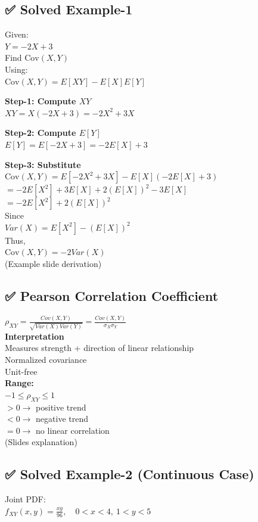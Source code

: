 \documentclass{article}
\begin{document}
\subsection{✅ Solved Example-1}
Given: \\
$Y=-2X+3$ \\
Find $\text{Cov}(X,Y)$ \\
Using: \\
$\text{Cov}(X,Y)=E[XY]-E[X]E[Y]$

\textbf{Step-1: Compute $XY$} \\
$XY=X(-2X+3)=-2X^2+3X$

\textbf{Step-2: Compute $E[Y]$} \\
$E[Y]=E[-2X+3]=-2E[X]+3$

\textbf{Step-3: Substitute} \\
$\text{Cov}(X,Y)=E[-2X^2+3X]-E[X](-2E[X]+3)$ \\
$=-2E[X^2]+3E[X]+2(E[X])^2-3E[X]$ \\
$=-2E[X^2]+2(E[X])^2$ \\
Since \\
$Var(X)=E[X^2]-(E[X])^2$ \\
Thus, \\
$\text{Cov}(X,Y)=-2Var(X)$ \\
(Example slide derivation)

\subsection{✅ Pearson Correlation Coefficient}
$\rho_{XY}=\frac{Cov(X,Y)}{\sqrt{Var(X)Var(Y)}} =\frac{Cov(X,Y)}{\sigma_X\sigma_Y}$ \\
\textbf{Interpretation} \\
Measures strength + direction of linear relationship \\
Normalized covariance \\
Unit-free \\
\textbf{Range:} \\
$-1\le \rho_{XY}\le 1$ \\
$>0 \rightarrow$ positive trend \\
$<0 \rightarrow$ negative trend \\
$=0 \rightarrow$ no linear correlation \\
(Slides explanation)

\subsection{✅ Solved Example-2 (Continuous Case)}
Joint PDF: \\
$f_{XY}(x,y)=\frac{xy}{96},\quad 0<x<4,\ 1<y<5$
\end{document}
